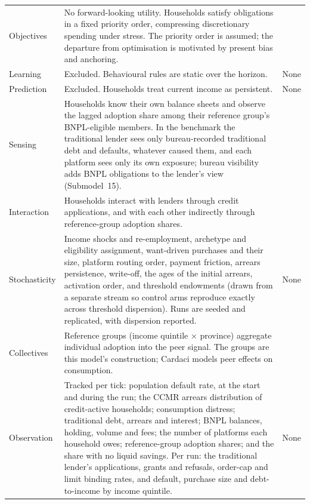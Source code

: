 \begin{longtable}{@{}L{2.9cm}L{7.7cm}L{3.2cm}@{}}
\addlinespace
Objectives & No forward-looking utility. Households satisfy obligations in a fixed priority order, compressing discretionary spending under stress. The priority order is assumed; the departure from optimisation is motivated by present bias and anchoring. & \citet{meier2010present,Keys2019} \\
\addlinespace
Learning & Excluded. Behavioural rules are static over the horizon. & None \\
\addlinespace
Prediction & Excluded. Households treat current income as persistent. & None \\
\addlinespace
Sensing & Households know their own balance sheets and observe the lagged adoption share among their reference group's \ac{BNPL}-eligible members. In the benchmark the traditional lender sees only bureau-recorded traditional debt and defaults, whatever caused them, and each platform sees only its own exposure; bureau visibility adds \ac{BNPL} obligations to the lender's view (Submodel~15). & \citet{dcasa_bnpl_2026,finasa_bnpl_2026} \\
\addlinespace
Interaction & Households interact with lenders through credit applications, and with each other indirectly through reference-group adoption shares. & \citet{ackert2025bnpl} \\
\addlinespace
Stochasticity & Income shocks and re-employment, archetype and eligibility assignment, want-driven purchases and their size, platform routing order, payment friction, arrears persistence, write-off, the ages of the initial arrears, activation order, and threshold endowments (drawn from a separate stream so control arms reproduce exactly across threshold dispersion). Runs are seeded and replicated, with dispersion reported. & None \\
\addlinespace
Collectives & Reference groups (income quintile $\times$ province) aggregate individual adoption into the peer signal. The groups are this model's construction; Cardaci models peer effects on consumption. & \citet{cardaci2018inequality} \\
\addlinespace
Observation & Tracked per tick: population default rate, at the start and during the run; the \ac{CCMR} arrears distribution of credit-active households; consumption distress; traditional debt, arrears and interest; \ac{BNPL} balances, holding, volume and fees; the number of platforms each household owes; reference-group adoption shares; and the share with no liquid savings. Per run: the traditional lender's applications, grants and refusals, order-cap and limit binding rates, and default, purchase size and debt-to-income by income quintile. & None \\

\end{longtable}
